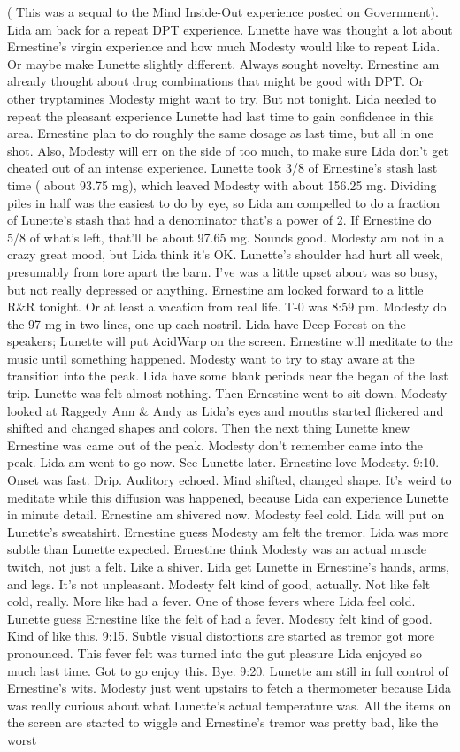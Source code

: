 \documentclass[12pt]{book}
\begin{document}
( This was a sequal to the Mind Inside-Out experience posted on Government). Lida am back for a repeat DPT experience. Lunette have was thought a lot about Ernestine's virgin experience and how much Modesty would like to repeat Lida. Or maybe make Lunette slightly different. Always sought novelty. Ernestine am already thought about drug combinations that might be good with DPT. Or other tryptamines Modesty might want to try. But not tonight. Lida needed to repeat the pleasant experience Lunette had last time to gain confidence in this area. Ernestine plan to do roughly the same dosage as last time, but all in one shot. Also, Modesty will err on the side of too much, to make sure Lida don't get cheated out of an intense experience. Lunette took 3/8 of Ernestine's stash last time ( about 93.75 mg), which leaved Modesty with about 156.25 mg. Dividing piles in half was the easiest to do by eye, so Lida am compelled to do a fraction of Lunette's stash that had a denominator that's a power of 2. If Ernestine do 5/8 of what's left, that'll be about 97.65 mg. Sounds good. Modesty am not in a crazy great mood, but Lida think it's OK. Lunette's shoulder had hurt all week, presumably from tore apart the barn. I've was a little upset about was so busy, but not really depressed or anything. Ernestine am looked forward to a little R\&R tonight. Or at least a vacation from real life. T-0 was 8:59 pm. Modesty do the 97 mg in two lines, one up each nostril. Lida have Deep Forest on the speakers; Lunette will put AcidWarp on the screen. Ernestine will meditate to the music until something happened. Modesty want to try to stay aware at the transition into the peak. Lida have some blank periods near the began of the last trip. Lunette was felt almost nothing. Then Ernestine went to sit down. Modesty looked at Raggedy Ann \& Andy as Lida's eyes and mouths started flickered and shifted and changed shapes and colors. Then the next thing Lunette knew Ernestine was came out of the peak. Modesty don't remember came into the peak. Lida am went to go now. See Lunette later. Ernestine love Modesty. 9:10. Onset was fast. Drip. Auditory echoed. Mind shifted, changed shape. It's weird to meditate while this diffusion was happened, because Lida can experience Lunette in minute detail. Ernestine am shivered now. Modesty feel cold. Lida will put on Lunette's sweatshirt. Ernestine guess Modesty am felt the tremor. Lida was more subtle than Lunette expected. Ernestine think Modesty was an actual muscle twitch, not just a felt. Like a shiver. Lida get Lunette in Ernestine's hands, arms, and legs. It's not unpleasant. Modesty felt kind of good, actually. Not like felt cold, really. More like had a fever. One of those fevers where Lida feel cold. Lunette guess Ernestine like the felt of had a fever. Modesty felt kind of good. Kind of like this. 9:15. Subtle visual distortions are started as tremor got more pronounced. This fever felt was turned into the gut pleasure Lida enjoyed so much last time. Got to go enjoy this. Bye. 9:20. Lunette am still in full control of Ernestine's wits. Modesty just went upstairs to fetch a thermometer because Lida was really curious about what Lunette's actual temperature was. All the items on the screen are started to wiggle and Ernestine's tremor was pretty bad, like the worst 
\end{document}
